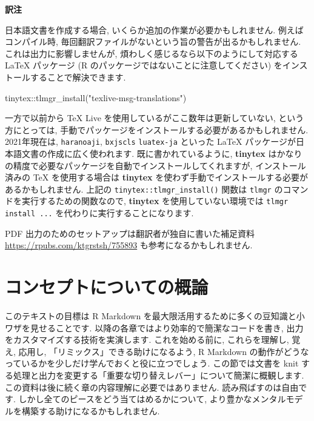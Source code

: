 \documentclass[
  11pt,
  lualatex,
  ja=standard]{bxjsreport}
\newenvironment{Shaded}{\begin{snugshade}}{\end{snugshade}}
\newcommand{\FunctionTok}[1]{\textcolor[rgb]{0.00,0.00,0.00}{#1}}
\newcommand{\NormalTok}[1]{#1}
\newcommand{\SpecialCharTok}[1]{\textcolor[rgb]{0.00,0.00,0.00}{#1}}
\newcommand{\StringTok}[1]{\textcolor[rgb]{0.31,0.60,0.02}{#1}}
\newenvironment{infobox}[1]{\begin{itemize}\renewcommand{\labelitemi}{\raisebox{-.7\height}[0pt][0pt]{%
  {\setkeys{Gin}{width=3em,keepaspectratio}\texttt{[image: \_latex/\_img/\#1]}}}}
  \setlength{\fboxsep}{1em}
  \begin{greyblock}
  \item
  }{\end{greyblock}\end{itemize}
}
\begin{document}
\begin{infobox}{memo}
\textbf{訳注}

日本語文書を作成する場合, いくらか追加の作業が必要かもしれません. 例えばコンパイル時, 毎回翻訳ファイルがないという旨の警告が出るかもしれません. これは出力に影響しませんが, 煩わしく感じるなら以下のようにして対応する LaTeX パッケージ (R のパッケージではないことに注意してください) をインストールすることで解決できます.

\begin{Shaded}
\begin{Highlighting}[]
\NormalTok{tinytex}\SpecialCharTok{::}\FunctionTok{tlmgr\_install}\NormalTok{(}\StringTok{"texlive{-}msg{-}translations"}\NormalTok{)}
\end{Highlighting}
\end{Shaded}

一方で以前から TeX Live を使用しているがここ数年は更新していない, という方にとっては, 手動でパッケージをインストールする必要があるかもしれません. 2021年現在は, \texttt{haranoaji}, \texttt{bxjscls} \texttt{luatex-ja} といった LaTeX パッケージが日本語文書の作成に広く使われます. 既に書かれているように, \textbf{tinytex} はかなりの精度で必要なパッケージを自動でインストールしてくれますが, インストール済みの TeX を使用する場合は \textbf{tinytex} を使わず手動でインストールする必要があるかもしれません. 上記の \texttt{tinytex::tlmgr\_install()} 関数は \texttt{tlmgr} のコマンドを実行するための関数なので, \textbf{tinytex} を使用していない環境では \texttt{tlmgr install ...} を代わりに実行することになります.

PDF 出力のためのセットアップは翻訳者が独自に書いた補足資料 \url{https://rpubs.com/ktgrstsh/755893} も参考になるかもしれません.

\end{infobox}

\hypertarget{conceptual-overview}{%
\chapter{コンセプトについての概論}\label{conceptual-overview}}

このテキストの目標は R Markdown を最大限活用するために多くの豆知識と小ワザを見せることです. 以降の各章ではより効率的で簡潔なコードを書き, 出力をカスタマイズする技術を実演します. これを始める前に, これらを理解し, 覚え, 応用し, 「リミックス」できる助けになるよう, R Markdown の動作がどうなっているかを少しだけ学んでおくと役に立つでしょう. この節では文書を knit する処理と出力を変更する「重要な切り替えレバー」について簡潔に概観します. この資料は後に続く章の内容理解に必要ではありません. 読み飛ばすのは自由です. しかし全てのピースをどう当てはめるかについて, より豊かなメンタルモデルを構築する助けになるかもしれません.
\end{document}
